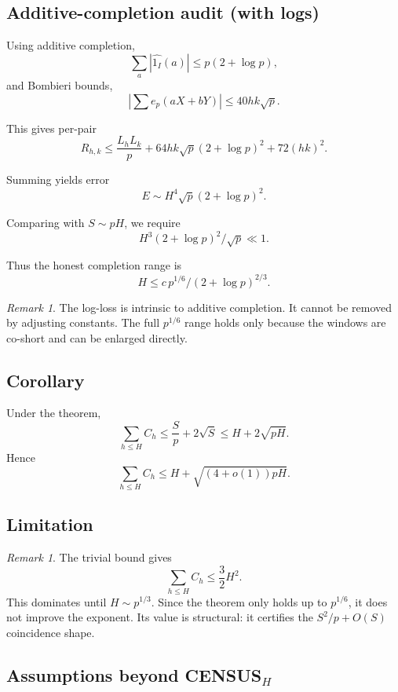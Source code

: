 \documentclass[11pt]{article}
\theoremstyle{remark}
\newtheorem{remark}[theorem]{Remark}
\begin{document}
\subsection*{Additive-completion audit (with logs)}

Using additive completion,
\[
\sum_a |\widehat{1_I}(a)| \le p(2+\log p),
\]
and Bombieri bounds,
\[
|\sum e_p(aX+bY)| \le 40 hk \sqrt p.
\]

This gives per-pair
\[
R_{h,k}
\le \frac{L_h L_k}{p}
+ 64 hk \sqrt p (2+\log p)^2
+ 72 (hk)^2.
\]

Summing yields error
\[
E \sim H^4 \sqrt p (2+\log p)^2.
\]

Comparing with $S \sim pH$, we require
\[
H^3 (2+\log p)^2 / \sqrt p \ll 1.
\]

Thus the honest completion range is
\[
\boxed{
H \le c \, p^{1/6} / (2+\log p)^{2/3}.
}
\]

\begin{remark}
The log-loss is intrinsic to additive completion.
It cannot be removed by adjusting constants.
The full $p^{1/6}$ range holds only because
the windows are co-short and can be enlarged directly.
\end{remark}

\subsection*{Corollary}

\begin{corollary}
Under the theorem,
\[
\sum_{h \le H} C_h
\le \frac{S}{p} + 2\sqrt{S}
\le H + 2 \sqrt{pH}.
\]
Hence
\[
\sum_{h \le H} C_h
\le H + \sqrt{(4+o(1)) pH}.
\]
\end{corollary}

\subsection*{Limitation}

\begin{remark}
The trivial bound gives
\[
\sum_{h\le H} C_h \le \frac{3}{2} H^2.
\]
This dominates until $H \sim p^{1/3}$.
Since the theorem only holds up to $p^{1/6}$,
it does not improve the exponent.
Its value is structural: it certifies the
$S^2/p + O(S)$ coincidence shape.
\end{remark}

\subsection*{Assumptions beyond CENSUS$_H$}
\end{document}
